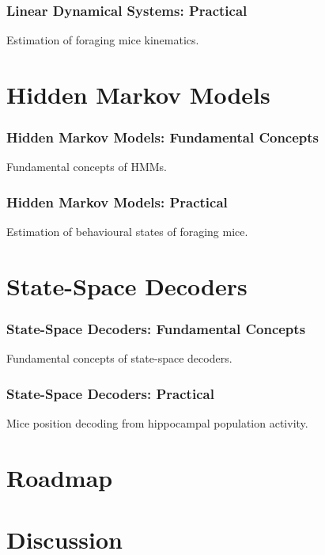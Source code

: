\documentclass{beamer}
\begin{document}
\begin{frame}
    \frametitle{Linear Dynamical Systems: Practical}

    Estimation of foraging mice kinematics.

\end{frame}

\section{Hidden Markov Models}

\begin{frame}
    \frametitle{Hidden Markov Models: Fundamental Concepts}

    Fundamental concepts of HMMs.

\end{frame}

\begin{frame}
    \frametitle{Hidden Markov Models: Practical}

    Estimation of behavioural states of foraging mice.

\end{frame}

\section{State-Space Decoders}

\begin{frame}
    \frametitle{State-Space Decoders: Fundamental Concepts}

    Fundamental concepts of state-space decoders.

\end{frame}

\begin{frame}
    \frametitle{State-Space Decoders: Practical}

    Mice position decoding from hippocampal population activity.

\end{frame}

\section{Roadmap}

\section{Discussion}
\end{document}
